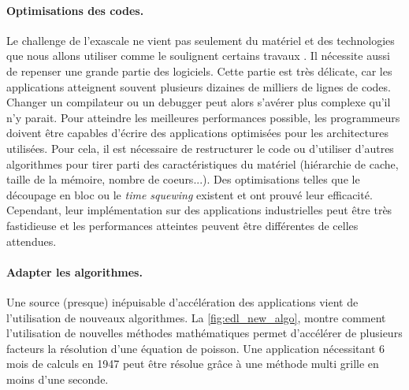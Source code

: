         
        \paragraph{Optimisations des codes.} 
            
            Le challenge de l’exascale ne vient pas seulement du matériel et des technologies que nous allons utiliser comme le soulignent certains travaux \cite{barrett2012navigating}. Il  nécessite aussi de repenser une grande partie des logiciels. Cette partie est très délicate, car les applications atteignent souvent plusieurs dizaines de milliers de lignes de codes. Changer un compilateur ou un debugger peut alors s’avérer plus complexe qu'il n’y parait. Pour atteindre les meilleures performances possible, les programmeurs doivent être capables d'écrire des applications optimisées pour les architectures utilisées. Pour cela, il est nécessaire de restructurer le code ou d'utiliser d'autres algorithmes pour tirer parti des caractéristiques du matériel (hiérarchie de cache, taille de la mémoire, nombre de coeurs...). Des optimisations telles que le découpage en bloc \cite{Xue2012} ou le \textit{time squewing} \cite{Wonnacott2002} existent et ont prouvé leur efficacité. Cependant, leur implémentation sur des applications industrielles peut être très fastidieuse et les performances atteintes peuvent être différentes de celles attendues. 
            

        \paragraph{Adapter les algorithmes.} Une source (presque) inépuisable d'accélération des applications vient de l'utilisation de nouveaux algorithmes. La \autoref{fig:edl_new_algo}, montre comment l'utilisation de nouvelles méthodes mathématiques permet d'accélérer de plusieurs facteurs la résolution d'une équation de poisson. Une application nécessitant 6 mois de calculs en 1947 peut être résolue grâce à une méthode multi grille \cite{Brandt1982} en moins d'une seconde.
            
